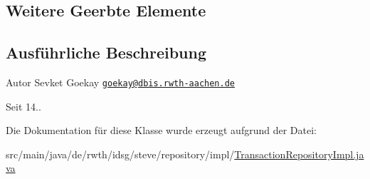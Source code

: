 \subsection*{Weitere Geerbte Elemente}


\subsection{Ausführliche Beschreibung}
\begin{DoxyAuthor}{Autor}
Sevket Goekay \href{mailto:goekay@dbis.rwth-aachen.de}{\tt goekay@dbis.\+rwth-\/aachen.\+de} 
\end{DoxyAuthor}
\begin{DoxySince}{Seit}
14.. 
\end{DoxySince}


Die Dokumentation für diese Klasse wurde erzeugt aufgrund der Datei\+:\begin{DoxyCompactItemize}
\item 
src/main/java/de/rwth/idsg/steve/repository/impl/\hyperlink{_transaction_repository_impl_8java}{Transaction\+Repository\+Impl.\+java}\end{DoxyCompactItemize}
